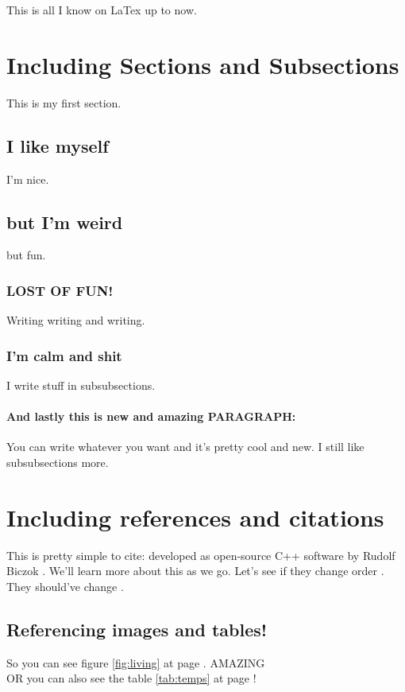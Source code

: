

\label{chap:howtodo}
This is all I know on LaTex up to now.

\section{Including Sections and Subsections}
This is my first section.

\subsection{I like myself}
I'm nice.

\subsection{but I'm weird}
but fun.

\subsubsection{LOST OF FUN!}
Writing writing and writing.

\subsubsection{I'm calm and shit}
I write stuff in subsubsections.

\paragraph*{And lastly this is new and amazing PARAGRAPH:} You can write whatever you want and it's pretty cool and new. I still like subsubsections more. 

\section{Including references and citations}
This is pretty simple to cite: developed as open-source C++ software by Rudolf Biczok \cite{nomenclatore}.
We'll learn more about this as we go. Let's see if they change order \cite{notonlyinfectious}. They should've change \cite{nonsoloinfezioni}.

\subsection{Referencing images and tables!}
So you can see figure \ref{fig:living} at page \pageref{fig:living}. AMAZING\\
OR you can also see the table \ref{tab:temps} at page \pageref{tab:temps}!

